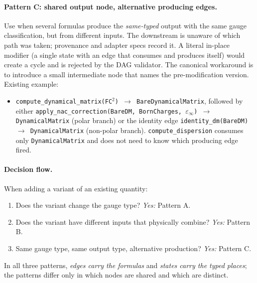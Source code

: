 \documentclass[11pt,a4paper]{article}
\begin{document}
\paragraph{Pattern C: shared output node, alternative producing edges.}
Use when several formulas produce the \emph{same-typed} output with the same
gauge classification, but from different inputs. The downstream is unaware of
which path was taken; provenance and adapter specs record it. A literal
in-place modifier (a single state with an edge that consumes and produces
itself) would create a cycle and is rejected by the DAG validator. The
canonical workaround is to introduce a small intermediate node that names
the pre-modification version. Existing example:
\begin{itemize}[leftmargin=2em]
  \item \texttt{compute\_dynamical\_matrix(FC$^2$) $\to$ BareDynamicalMatrix},
        followed by either
        \texttt{apply\_nac\_correction(BareDM, BornCharges, $\varepsilon_\infty$)
        $\to$ DynamicalMatrix} (polar branch) or the identity edge
        \texttt{identity\_dm(BareDM) $\to$ DynamicalMatrix} (non-polar
        branch). \texttt{compute\_dispersion} consumes only
        \texttt{DynamicalMatrix} and does not need to know which producing
        edge fired.
\end{itemize}

\paragraph{Decision flow.} When adding a variant of an existing quantity:
\begin{enumerate}[leftmargin=2em]
  \item Does the variant change the gauge type? \emph{Yes:} Pattern A.
  \item Does the variant have different inputs that physically combine?
        \emph{Yes:} Pattern B.
  \item Same gauge type, same output type, alternative production?
        \emph{Yes:} Pattern C.
\end{enumerate}
In all three patterns, \emph{edges carry the formulas} and \emph{states carry
the typed places}; the patterns differ only in which nodes are shared and
which are distinct.
\end{document}
